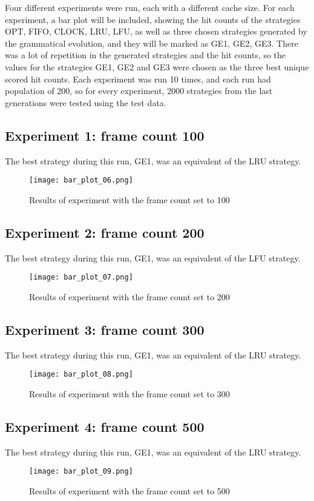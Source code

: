 Four different experiments were run, each with a different cache size. For each experiment, a bar plot will be included, showing the hit counts of the strategies OPT, FIFO, CLOCK, LRU, LFU, as well as three chosen strategies generated by the grammatical evolution, and they will be marked as GE1, GE2, GE3. There was a lot of repetition in the generated strategies and the hit counts, so the values for the strategies GE1, GE2 and GE3 were chosen as the three best unique scored hit counts. Each experiment was run 10 times, and each run had population of 200, so for every experiment, 2000 strategies from the last generations were tested using the test data.

\newpage
\subsection{Experiment 1: frame count 100}
The best strategy during this run, GE1, was an equivalent of the LRU strategy.
\begin{figure}[H]
	\centering
	\texttt{[image: bar\_plot\_06.png]}
	\caption{Results of experiment with the frame count set to 100}
\end{figure}

\subsection{Experiment 2: frame count 200}
The best strategy during this run, GE1, was an equivalent of the LFU strategy.
\begin{figure}[H]
	\centering
	\texttt{[image: bar\_plot\_07.png]}
	\caption{Results of experiment with the frame count set to 200}
\end{figure}

\newpage
\subsection{Experiment 3: frame count 300}
The best strategy during this run, GE1, was an equivalent of the LRU strategy.
\begin{figure}[H]
	\centering
	\texttt{[image: bar\_plot\_08.png]}
	\caption{Results of experiment with the frame count set to 300}
\end{figure}

\subsection{Experiment 4: frame count 500}
The best strategy during this run, GE1, was an equivalent of the LRU strategy.
\begin{figure}[H]
	\centering
	\texttt{[image: bar\_plot\_09.png]}
	\caption{Results of experiment with the frame count set to 500}
\end{figure}


